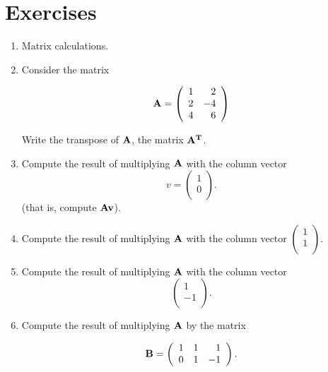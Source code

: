 \newpage
\section*{Exercises}

\begin{enumerate}	%

\item Matrix calculations.

\be
 \item  Consider the matrix

\[
\bf A = 
 \left ( 
  \begin{array}{rr}
      1 & 2 \\
      2 & -4 \\
      4 & 6 \\
  \end{array}
 \right )
\]

Write the transpose of $\bf A$, the matrix $\bf A^T$.
 
 \item  Compute the result of multiplying $\bf A$ with the column
vector 
\[
v = 
 \left ( 
  \begin{array}{r}
    1 \\ 
    0 \\ 
   \end{array} 
 \right ).
\]
(that is, compute $\bf A v$).
 
 \item
Compute the result of multiplying $\bf A$ with the column
vector 
$\left ( \begin{array}{r} 1 \\ 1 \\ \end{array}  \right ) $.

 \item Compute the result of multiplying $\bf A$ with the column
vector 
\[
 \left ( 
  \begin{array}{r} 
   1  \\ 
   -1 \\ 
  \end{array}
 \right ).
\]
 
 \item Compute the result of multiplying $\bf A$ by the matrix

\[
\bf B = 
 \left (
   \begin{array}{rrr}
      1 & 1  & 1 \\
      0 & 1 & -1 \\
   \end{array}
 \right ).
\]


\end{enumerate}
